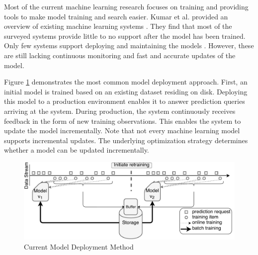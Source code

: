 \documentclass[10pt,conference,letterpaper]{IEEEtran}
\begin{document}
Most of the current machine learning research focuses on training and providing tools to make model training and search easier. 
Kumar et al. provided an overview of existing machine learning systems \cite{kumar2015survey}. 
They find that most of the surveyed systems provide little to no support after the model has been trained.
Only few systems support deploying and maintaining the models \cite{akdere2011case, crankshaw2014missing}.
However, these are still lacking continuous monitoring and fast and accurate updates of the model.

Figure \ref{fig:velox-work-flow} demonstrates the most common model deployment approach.
First, an initial model is trained based on an existing dataset residing on disk.
Deploying this model to a production environment enables it to answer prediction queries arriving at the system.
During production, the system continuously receives feedback in the form of new training observations.
This enables the system to update the model incrementally.
Note that not every machine learning model supports incremental updates.
The underlying optimization strategy determines whether a model can be updated incrementally.
\begin{figure}[t]
\centering
\includegraphics[width=1\columnwidth]{../images/velox-final.pdf}
\caption{Current Model Deployment Method}
\label{fig:velox-work-flow}
\end{figure}
\end{document}
